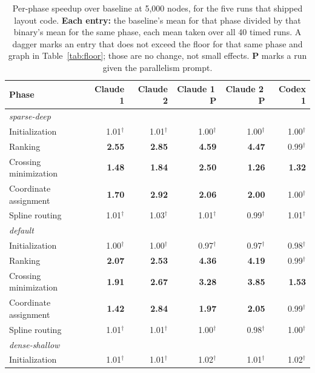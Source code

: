 \begin{table}[htbp]
\centering
\caption{Per-phase speedup over baseline at 5{,}000 nodes, for the five runs
that shipped layout code. \textbf{Each entry:} the baseline's mean for that
phase divided by that binary's mean for the same phase, each mean taken over all
40 timed runs. A dagger marks an entry that does not exceed the floor for that
same phase and graph in Table~\ref{tab:floor}; those are no change, not small
effects. \textbf{P} marks a run given the parallelism prompt.}
\label{tab:phases}
\small
\begin{tabular}{lrrrrr}
\toprule
\textbf{Phase} & \textbf{Claude 1} & \textbf{Claude 2} & \textbf{Claude 1\,P} & \textbf{Claude 2\,P} & \textbf{Codex 1} \\
\midrule
\multicolumn{6}{l}{\emph{sparse-deep}} \\
Initialization        & 1.01$^\dagger$ & 1.01$^\dagger$ & 1.00$^\dagger$ & 1.00$^\dagger$ & 1.00$^\dagger$ \\
Ranking               & \textbf{2.55} & \textbf{2.85} & \textbf{4.59} & \textbf{4.47} & 0.99$^\dagger$ \\
Crossing minimization & \textbf{1.48} & \textbf{1.84} & \textbf{2.50} & \textbf{1.26} & \textbf{1.32} \\
Coordinate assignment & \textbf{1.70} & \textbf{2.92} & \textbf{2.06} & \textbf{2.00} & 1.00$^\dagger$ \\
Spline routing        & 1.01$^\dagger$ & 1.03$^\dagger$ & 1.01$^\dagger$ & 0.99$^\dagger$ & 1.01$^\dagger$ \\
\midrule
\multicolumn{6}{l}{\emph{default}} \\
Initialization        & 1.00$^\dagger$ & 1.00$^\dagger$ & 0.97$^\dagger$ & 0.97$^\dagger$ & 0.98$^\dagger$ \\
Ranking               & \textbf{2.07} & \textbf{2.53} & \textbf{4.36} & \textbf{4.19} & 0.99$^\dagger$ \\
Crossing minimization & \textbf{1.91} & \textbf{2.67} & \textbf{3.28} & \textbf{3.85} & \textbf{1.53} \\
Coordinate assignment & \textbf{1.42} & \textbf{2.84} & \textbf{1.97} & \textbf{2.05} & 0.99$^\dagger$ \\
Spline routing        & 1.01$^\dagger$ & 1.01$^\dagger$ & 1.00$^\dagger$ & 0.98$^\dagger$ & 1.00$^\dagger$ \\
\midrule
\multicolumn{6}{l}{\emph{dense-shallow}} \\
Initialization        & 1.01$^\dagger$ & 1.01$^\dagger$ & 1.02$^\dagger$ & 1.01$^\dagger$ & 1.02$^\dagger$ \\

\end{tabular}
\end{table}
